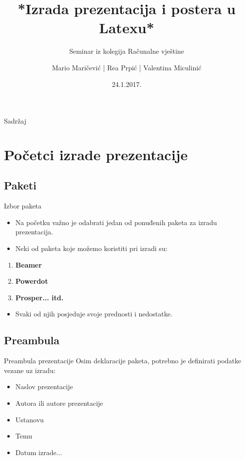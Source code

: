 \documentclass{beamer}
\author[Maričević,Prpić,Miculinić]{Mario Maričević | Rea Prpić | Valentina Miculinić}
\title{*Izrada prezentacija i postera u Latexu*}
\subtitle{Seminar iz kolegija Računalne vještine}
\institute{Tehnički fakultet,Rijeka}
\date{24.1.2017.}
\begin{document}
\begin{frame}
\titlepage
\end{frame}
\begin{frame}{Sadržaj}
\tableofcontents
\end{frame}

\section{Početci izrade prezentacije}
\subsection{Paketi}

\begin{frame}{Izbor paketa}
\begin{itemize}
	\item Na početku važno je odabrati jedan od ponuđenih paketa za izradu prezentacija.
	\item Neki od paketa koje možemo koristiti pri izradi su:
\end{itemize}
\begin{enumerate}
	\item \textbf{Beamer} 
	\item \textbf{Powerdot} 
	\item \textbf{Prosper... itd.}
\end{enumerate}
\begin{itemize}
	\item Svaki od njih posjeduje svoje prednosti i nedostatke.
\end{itemize}
\end{frame}

\subsection{Preambula}

\begin{frame}{Preambula prezentacije}
Osim deklaracije paketa, potrebno je definirati podatke vezane uz izradu:
\begin{itemize}
	\item Naslov prezentacije \pause
	\item Autora ili autore prezentacije \pause
	\item Ustanovu \pause
	\item Temu \pause
	\item Datum izrade...
\end{itemize} 
\end{frame}
\end{document}
